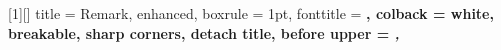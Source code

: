  [1][]
 {
	title = Remark, 
 	enhanced,
 	boxrule = 1pt,
 	fonttitle = \bf \color{black},
	colback = white,
 	breakable,
        sharp corners,
	detach title,
	before upper =  \tcbtitle \it \quad ,
 }







 \newcommand{\integral}[4]{\int\limits_{#1}^{#2} #4 d#3}
\newcommand{\limit}[3]{\lim\limits_{#1 \rightarrow #2} #3}
\newcommand{\strone}[2]{\left[ \begin{gathered}#1\\ #2\end{gathered} \right] }
\newcommand{\strtwo}[2]{\left\{ \begin{gathered}#1\\ #2\end{gathered} \right\} }
\newcommand{\strthree}[2]{\left\lfloor \begin{gathered}#1\\ #2\end{gathered} \right\rfloor }


\newcommand{\startbf}[1]{\text{\bfseries{#1}}}
\newcommand{\sett}[1]{\left\{ #1 \right\}}
\newcommand{\thesis}[1]{\left( #1 \right)}
\newcommand{\brkt}[1]{\left[ #1 \right]}
\newcommand{\floor}[1]{\left\lfloor #1 \right\rfloor}


\DeclareMathOperator{\img}{im} %
\DeclareMathOperator{\Img}{Im} %
\DeclareMathOperator{\coker}{coker} %
\DeclareMathOperator{\Coker}{Coker} %
\DeclareMathOperator{\Ker}{Ker} %
\DeclareMathOperator{\rank}{rank}
\DeclareMathOperator{\Spec}{Spec} %
\DeclareMathOperator{\Tr}{Tr} %
\DeclareMathOperator{\pr}{pr} %
\DeclareMathOperator{\ext}{ext} %
\DeclareMathOperator{\pred}{pred} %
\DeclareMathOperator{\dom}{dom} %
\DeclareMathOperator{\ran}{ran} %
\DeclareMathOperator{\Hom}{Hom} %
\DeclareMathOperator{\Mor}{Mor} %
\DeclareMathOperator{\End}{End} %


\newcommand{\lm}{\ensuremath{\lambda}}
\newcommand{\eps}{\ensuremath{\epsilon}}
\newcommand{\veps}{\ensuremath{\varepsilon}}
\newcommand{\al}{\ensuremath{\alpha}}
\newcommand{\bb}{\ensuremath{\beta}}
\newcommand{\cc}{\ensuremath{\gamma}}
\newcommand{\dd}{\ensuremath{\delta}}
\newcommand{\DD}{\ensuremath{\Delta}}
\newcommand{\ff}{\ensuremath{\phi}}
\newcommand{\FF}{\ensuremath{\varphi}}

